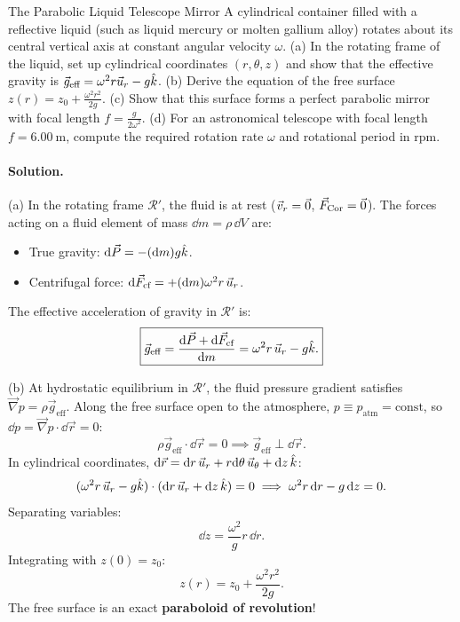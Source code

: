 \begin{workedexample}{The Parabolic Liquid Telescope Mirror}
A cylindrical container filled with a reflective liquid (such as liquid mercury or molten gallium alloy) rotates about its central vertical axis at constant angular velocity $\omega$.
(a) In the rotating frame of the liquid, set up cylindrical coordinates $(r, \theta, z)$ and show that the effective gravity is $\vec{g}_{\text{eff}} = \omega^2 r\vec{u}_r - g\hat{k}$.
(b) Derive the equation of the free surface $z(r) = z_0 + \frac{\omega^2 r^2}{2g}$.
(c) Show that this surface forms a perfect parabolic mirror with focal length $f = \frac{g}{2\omega^2}$.
(d) For an astronomical telescope with focal length $f = 6.00\ \mathrm{m}$, compute the required rotation rate $\omega$ and rotational period in rpm.

\paragraph{Solution.}

(a) In the rotating frame $\mathcal{R}'$, the fluid is at rest ($\vec{v}_r = \vec{0}$, $\vec{F}_{\text{Cor}} = \vec{0}$).
The forces acting on a fluid element of mass $\dd m = \rho\,\dd V$ are:
\begin{itemize}[leftmargin=1.4em,itemsep=2pt]
  \item True gravity: $\mathrm{d}\vec{P} = -(\mathrm{d} m)g\hat{k}$.
  \item Centrifugal force: $\mathrm{d}\vec{F}_{\text{cf}} = +(\mathrm{d} m)\omega^2 r\,\vec{u}_r$.
\end{itemize}
The effective acceleration of gravity in $\mathcal{R}'$ is:
\[
\boxed{\vec{g}_{\text{eff}} = \frac{\mathrm{d}\vec{P} + \mathrm{d}\vec{F}_{\text{cf}}}{\mathrm{d} m} = \omega^2 r\,\vec{u}_r - g\hat{k}.}
\]

(b) At hydrostatic equilibrium in $\mathcal{R}'$, the fluid pressure gradient satisfies $\vec{\nabla} p = \rho\vec{g}_{\text{eff}}$.
Along the free surface open to the atmosphere, $p \equiv p_{\text{atm}} = \text{const}$, so $\dd p = \vec{\nabla} p\cdot\dd\vec{r} = 0$:
\[
\rho\vec{g}_{\text{eff}}\cdot\dd\vec{r} = 0 \implies \vec{g}_{\text{eff}}\perp\dd\vec{r}.
\]
In cylindrical coordinates, $\mathrm{d}\vec{r} = \mathrm{d} r\,\vec{u}_r + r\mathrm{d}\theta\,\vec{u}_\theta + \mathrm{d} z\,\hat{k}$:
\[
(\omega^2 r\,\vec{u}_r - g\hat{k})\cdot(\mathrm{d} r\,\vec{u}_r + \mathrm{d} z\,\hat{k}) = 0 \implies \omega^2 r\,\mathrm{d} r - g\,\mathrm{d} z = 0.
\]
Separating variables:
\[
\dd z = \frac{\omega^2}{g}r\,\dd r.
\]
Integrating with $z(0) = z_0$:
\[
\boxed{z(r) = z_0 + \frac{\omega^2 r^2}{2g}.}
\]
The free surface is an exact \textbf{paraboloid of revolution}!


\end{workedexample}

